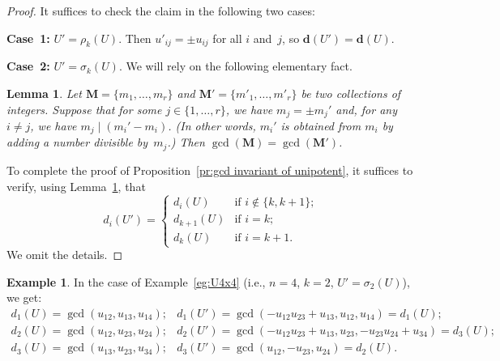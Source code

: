\documentclass[11pt, letterpaper]{amsart}
\newtheorem{lemma}[theorem]{Lemma}
\theoremstyle{definition}
\newtheorem{example}[theorem]{Example}
\numberwithin{equation}{section}
\begin{document}
\begin{proof}
It suffices to check the claim in the following two cases: %

\noindent
\textbf{Case~1:} 
$U' = \rho_k(U)$.
Then $u'_{ij} = \pm u_{ij}$ for all $i$ and~$j$, so $\mathbf{d}(U') = \mathbf{d}(U)$.

\noindent
\textbf{Case~2:} 
$U' = \sigma_k(U)$.
We will rely on the following elementary fact. 

\begin{lemma}
\label{lem:gcd}
Let $\mathbf{M}=\{m_1,\dots,m_r\}$ and $\mathbf{M'}=\{m'_1,\dots,m'_r\}$
be two collections of integers. 
Suppose that for some $j\in\{1,\dots,r\}$, we have $m_j=\pm m_j'$
and, for any $i\ne j$, we have $m_j \mid (m_i'-m_i)$.
(In other words, $m_i'$ is obtained from $m_i$ by adding a number divisible by~$m_j$.)
Then $\operatorname{gcd}(\mathbf{M})=\operatorname{gcd}(\mathbf{M'})$. 
\end{lemma}

\enlargethispage{5pt}

To complete the proof of Proposition~\ref{pr:gcd invariant of unipotent},
it suffices to verify, using Lemma~\ref{lem:gcd}, that 
\begin{equation*}
d_i(U') = 
\begin{cases}
d_i(U) & \text{if $i\notin\{k,k+1\}$;} \\
d_{k+1}(U) & \text{if $i=k$;} \\
d_k(U) & \text{if $i=k+1$.} 
\end{cases}
\end{equation*}
We omit the details. 
\end{proof}

\begin{example}
In the case of Example~\ref{eg:U4x4} (i.e., $n=4$, $k=2$, $U'=\sigma_2(U)$), 
we get:
\begin{equation*}
\begin{array}{ll}
d_1(U)\!=\!\operatorname{gcd}(u_{12}, u_{13}, u_{14});  
	& d_1(U')\!=\!\operatorname{gcd}(-u_{12}u_{23}+u_{13}, u_{12} , u_{14} ) \!=\! d_1(U); \\[3pt]
d_2(U)\!=\!\operatorname{gcd}(u_{12}, u_{23}, u_{24}); 
	& d_2(U') \!=\!\operatorname{gcd}(-u_{12}u_{23}+u_{13}, u_{23}, -u_{23}u_{24}+u_{34})\!=\!d_3(U);\\[3pt]
d_3(U)\!=\!\operatorname{gcd}(u_{13}, u_{23}, u_{34}); 
	& d_3(U')\!=\!\operatorname{gcd}(u_{12}, -u_{23}, u_{24}) \!=\! d_2(U). 
\end{array}
\end{equation*}
\end{example}
\end{document}
